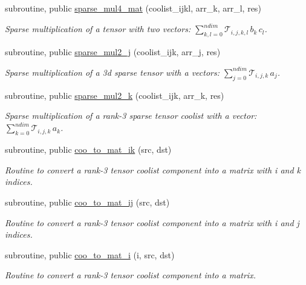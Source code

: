 \begin{DoxyCompactItemize}
subroutine, public \hyperlink{namespacetensor_a2fda12a024f8e3d0d6a167f264f6d000}{sparse\+\_\+mul4\+\_\+mat} (coolist\+\_\+ijkl, arr\+\_\+k, arr\+\_\+l, res)
\begin{DoxyCompactList}\small\item\em Sparse multiplication of a tensor with two vectors\+: ${\displaystyle \sum_{k,l=0}^{ndim}} \mathcal{T}_{i,j,k,l} \,b_k \, c_l $. \end{DoxyCompactList}\item 
subroutine, public \hyperlink{namespacetensor_ad9b09d91fb1bd425122c4f1ee2f0eb12}{sparse\+\_\+mul2\+\_\+j} (coolist\+\_\+ijk, arr\+\_\+j, res)
\begin{DoxyCompactList}\small\item\em Sparse multiplication of a 3d sparse tensor with a vectors\+: ${\displaystyle \sum_{j=0}^{ndim}} \mathcal{T}_{i,j,k} \, a_j $. \end{DoxyCompactList}\item 
subroutine, public \hyperlink{namespacetensor_a90e31e5e782d63d7f05ee3c9aed370e0}{sparse\+\_\+mul2\+\_\+k} (coolist\+\_\+ijk, arr\+\_\+k, res)
\begin{DoxyCompactList}\small\item\em Sparse multiplication of a rank-\/3 sparse tensor coolist with a vector\+: ${\displaystyle \sum_{k=0}^{ndim}} \mathcal{T}_{i,j,k} \, a_k $. \end{DoxyCompactList}\item 
subroutine, public \hyperlink{namespacetensor_a52784eb2977ec36f8ab5ba240b497633}{coo\+\_\+to\+\_\+mat\+\_\+ik} (src, dst)
\begin{DoxyCompactList}\small\item\em Routine to convert a rank-\/3 tensor coolist component into a matrix with i and k indices. \end{DoxyCompactList}\item 
subroutine, public \hyperlink{namespacetensor_af104cb6f7354f1465eb53e0f3738a3d0}{coo\+\_\+to\+\_\+mat\+\_\+ij} (src, dst)
\begin{DoxyCompactList}\small\item\em Routine to convert a rank-\/3 tensor coolist component into a matrix with i and j indices. \end{DoxyCompactList}\item 
subroutine, public \hyperlink{namespacetensor_ac77bcc80d4bd189835b88db68ffafda4}{coo\+\_\+to\+\_\+mat\+\_\+i} (i, src, dst)
\begin{DoxyCompactList}\small\item\em Routine to convert a rank-\/3 tensor coolist component into a matrix. \end{DoxyCompactList}\item 

\end{DoxyCompactItemize}
